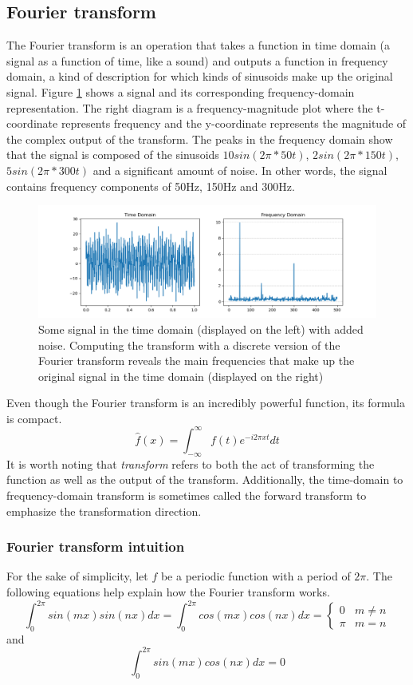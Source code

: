 \subsection{Fourier transform} 
The Fourier transform is an operation that takes a function in time domain (a signal as a function of time, like a sound) and outputs a function in frequency domain, a kind of description for which kinds of sinusoids make up the original signal. Figure \ref{fig:transform} shows a signal and its corresponding frequency-domain representation. The right diagram is a frequency-magnitude plot where the t-coordinate represents frequency and the y-coordinate represents the magnitude of the complex output of the transform. The peaks in the frequency domain show that the signal is composed of the sinusoids $10sin(2\pi * 50t)$, $2sin(2\pi * 150t)$, $5sin(2\pi * 300t)$ and a significant amount of noise. In other words, the signal contains frequency components of 50Hz, 150Hz and 300Hz. 

\begin{figure}[ht]
    \centering
    \includegraphics[width=\textwidth]{./images/transform.png}
    \caption{Some signal in the time domain (displayed on the left) with added noise. Computing the transform with a discrete version of the Fourier transform reveals the main frequencies that make up the original signal in the time domain (displayed on the right)\label{fig:transform}}
\end{figure}

Even though the Fourier transform is an incredibly powerful function, its formula is compact. 
$$\hat{f}(x) = \int_{-\infty}^{\infty} f(t)e^{-i2\pi x t} dt$$
It is worth noting that \textit{transform} refers to both the act of transforming the function as well as the output of the transform. Additionally, the time-domain to frequency-domain transform is sometimes called the forward transform to emphasize the transformation direction. 

\subsubsection{Fourier transform intuition}
For the sake of simplicity, let $f$ be a periodic function with a period of $2\pi$. The following equations help explain how the Fourier transform works.
\[ \int_0^{2\pi} sin(mx)sin(nx)dx = \int_0^{2\pi} cos(mx)cos(nx)dx= 
\begin{cases} %
    0 & m\neq n \\
    \pi & m=n
\end{cases} 
\]
\noindent and
$$\int_0^{2\pi} sin(mx)cos(nx)dx = 0$$

